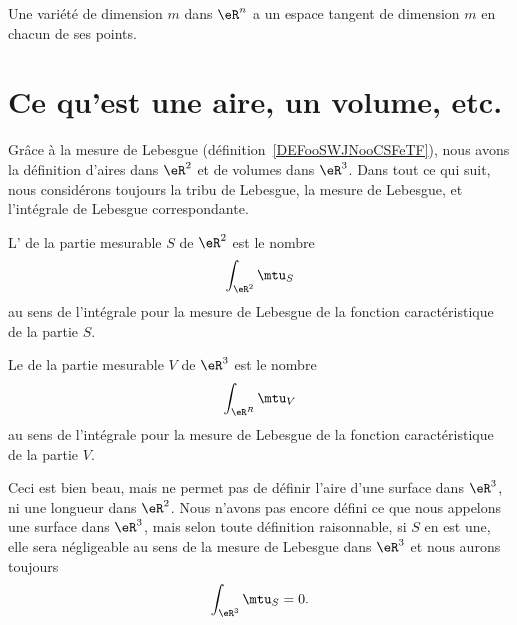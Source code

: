 \begin{proposition}         \label{PropDimEspTanVarConst}
    Une variété de dimension $m$ dans $\eR^n$ a un espace tangent de dimension $m$ en chacun de ses points.
\end{proposition}

\section{Ce qu'est une aire, un volume, etc.}

Grâce à la mesure de Lebesgue (définition~\ref{DEFooSWJNooCSFeTF}), nous avons la définition d'aires dans \( \eR^2\) et de volumes dans \( \eR^3\). Dans tout ce qui suit, nous considérons toujours la tribu de Lebesgue, la mesure de Lebesgue, et l'intégrale de Lebesgue correspondante.

\begin{definition}      \label{DEFooPZRDooWbbBXy}
    L' de la partie mesurable \( S\) de \( \eR^2\) est le nombre
    \begin{equation}
        \int_{\eR^2}\mtu_S
    \end{equation}
    au sens de l'intégrale pour la mesure de Lebesgue de la fonction caractéristique de la partie \( S\).
\end{definition}

\begin{definition}
    Le  de la partie mesurable \( V\) de \( \eR^3\) est le nombre
    \begin{equation}
        \int_{\eR^R}\mtu_V
    \end{equation}
    au sens de l'intégrale pour la mesure de Lebesgue de la fonction caractéristique de la partie \( V\).
\end{definition}

Ceci est bien beau, mais ne permet pas de définir l'aire d'une surface dans \( \eR^3\), ni une longueur dans \( \eR^2\). Nous n'avons pas encore défini ce que nous appelons une surface dans \( \eR^3\), mais selon toute définition raisonnable, si \( S\) en est une, elle sera négligeable au sens de la mesure de Lebesgue dans \( \eR^3\) et nous aurons toujours
\begin{equation}
    \int_{\eR^3}\mtu_S=0.
\end{equation}


